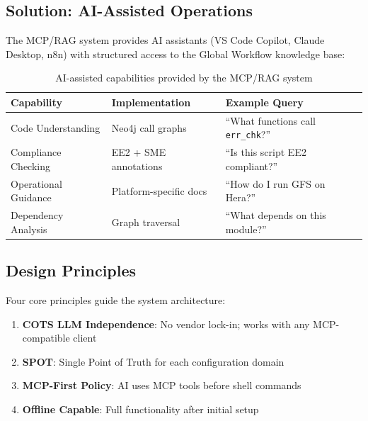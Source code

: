 \documentclass[11pt,letterpaper,twoside]{article}
\begin{document}
\subsection{Solution: AI-Assisted Operations}

The MCP/RAG system provides AI assistants (VS Code Copilot, Claude Desktop, n8n) with structured access to the Global Workflow knowledge base:

\begin{table}[H]
\centering
\renewcommand{\arraystretch}{1.3}
\begin{tabularx}{\textwidth}{l|l|X}
\toprule
\textbf{Capability} & \textbf{Implementation} & \textbf{Example Query} \\
\midrule
Code Understanding & Neo4j call graphs & ``What functions call \texttt{err\_chk}?'' \\
Compliance Checking & EE2 + SME annotations & ``Is this script EE2 compliant?'' \\
Operational Guidance & Platform-specific docs & ``How do I run GFS on Hera?'' \\
Dependency Analysis & Graph traversal & ``What depends on this module?'' \\
\bottomrule
\end{tabularx}
\caption{AI-assisted capabilities provided by the MCP/RAG system}
\end{table}

\subsection{Design Principles}

\begin{keyinsight}
Four core principles guide the system architecture:
\begin{enumerate}[leftmargin=1.5em]
    \item \textbf{COTS LLM Independence}: No vendor lock-in; works with any MCP-compatible client
    \item \textbf{SPOT}: Single Point of Truth for each configuration domain
    \item \textbf{MCP-First Policy}: AI uses MCP tools before shell commands
    \item \textbf{Offline Capable}: Full functionality after initial setup
\end{enumerate}
\end{keyinsight}

\newpage
\end{document}
